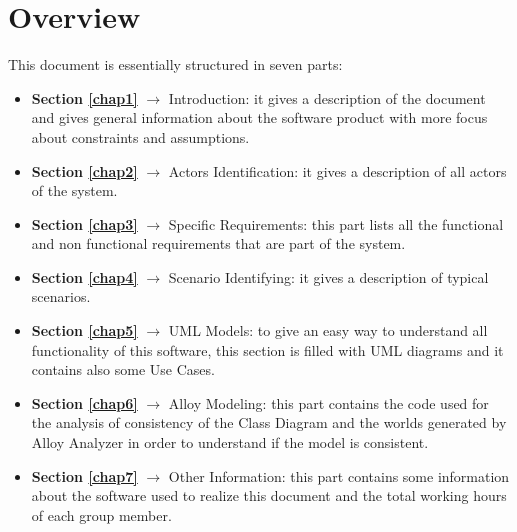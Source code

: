 \section{Overview}
This document is essentially structured in seven parts:
\begin{itemize}
	\item \textbf{Section \ref{chap1}} $\rightarrow$ Introduction: it gives a description of the document and gives general information about the software product with more focus about constraints and assumptions.
	\item \textbf{Section \ref{chap2}} $\rightarrow$ Actors Identification: it gives a description of all actors of the system.
	\item \textbf{Section \ref{chap3}} $\rightarrow$ Specific Requirements: this part lists all the functional and non functional requirements that are part of the system.
	\item \textbf{Section \ref{chap4}} $\rightarrow$ Scenario Identifying: it gives a description of typical scenarios.
	\item \textbf{Section \ref{chap5}} $\rightarrow$ UML Models: to give an easy way to understand all functionality of this software, this section is filled with UML diagrams and it contains also some Use Cases.
	\item \textbf{Section \ref{chap6}} $\rightarrow$ Alloy Modeling: this part contains the code used for the analysis of consistency of the Class Diagram and the worlds generated by Alloy Analyzer in order to understand if the model is consistent.
	\item \textbf{Section \ref{chap7}} $\rightarrow$ Other Information: this part contains some information about the software used to realize this document and the total working hours of each group member.
\end{itemize}